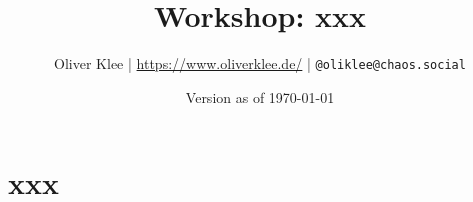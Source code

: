\documentclass[a4paper,openany,twoside,titlepage,10pt,headsepline]{scrbook}
\author{Oliver Klee | \url{https://www.oliverklee.de/} | \texttt{@oliklee@chaos.social}}
\title{Workshop: xxx}
\date{Version as of \today}
\begin{document}
\frontmatter

\maketitle

\tableofcontents

\mainmatter

\chapter{xxx}






\backmatter
\end{document}
